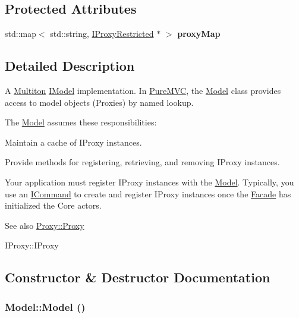 \subsection*{Protected Attributes}
\begin{DoxyCompactItemize}
\item 
\hypertarget{class_pure_m_v_c_1_1_model_a05b515e1dbe5d783442e7c55efaa11e1}{
std::map$<$ std::string, \hyperlink{class_pure_m_v_c_1_1_i_proxy_restricted}{IProxyRestricted} $\ast$ $>$ {\bfseries proxyMap}}
\label{class_pure_m_v_c_1_1_model_a05b515e1dbe5d783442e7c55efaa11e1}

\end{DoxyCompactItemize}


\subsection{Detailed Description}
A \hyperlink{class_pure_m_v_c_1_1_multiton}{Multiton} {\ttfamily \hyperlink{class_pure_m_v_c_1_1_i_model}{IModel}} implementation. In \hyperlink{namespace_pure_m_v_c}{PureMVC}, the {\ttfamily \hyperlink{class_pure_m_v_c_1_1_model}{Model}} class provides access to model objects (Proxies) by named lookup.

The {\ttfamily \hyperlink{class_pure_m_v_c_1_1_model}{Model}} assumes these responsibilities:


\begin{DoxyItemize}
\item Maintain a cache of {\ttfamily IProxy} instances. 
\item Provide methods for registering, retrieving, and removing {\ttfamily IProxy} instances. 
\end{DoxyItemize}

Your application must register {\ttfamily IProxy} instances with the {\ttfamily \hyperlink{class_pure_m_v_c_1_1_model}{Model}}. Typically, you use an {\ttfamily \hyperlink{class_pure_m_v_c_1_1_i_command}{ICommand}} to create and register {\ttfamily IProxy} instances once the {\ttfamily \hyperlink{class_pure_m_v_c_1_1_facade}{Facade}} has initialized the Core actors.

\begin{DoxySeeAlso}{See also}
\hyperlink{class_pure_m_v_c_1_1_proxy_ab9b9198b6a4aeec5fa06f8a73c1d96f8}{Proxy::Proxy} 

IProxy::IProxy 
\end{DoxySeeAlso}


\subsection{Constructor \& Destructor Documentation}
\hypertarget{class_pure_m_v_c_1_1_model_ae3b375de5f6df4faf74a95d64748e048}{
\subsubsection[{Model}]{\setlength{\rightskip}{0pt plus 5cm}Model::Model ()}}
\label{class_pure_m_v_c_1_1_model_ae3b375de5f6df4faf74a95d64748e048}


